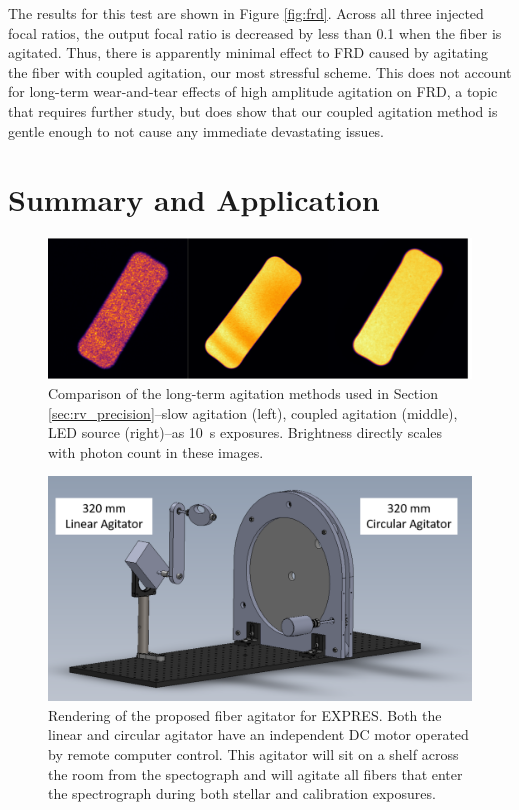 \documentclass[twocolumn]{emulateapj}
\begin{document}
The results for this test are shown in Figure {\ref{fig:frd}}. Across all three injected focal ratios, the output focal ratio is decreased by less than 0.1 when the fiber is agitated. Thus, there is apparently minimal effect to FRD caused by agitating the fiber with coupled agitation, our most stressful scheme. This does not account for long-term wear-and-tear effects of high amplitude agitation on FRD, a topic that requires further study, but does show that our coupled agitation method is gentle enough to not cause any immediate devastating issues.

\section{Summary and Application}
\label{sec:conclusions}

\begin{figure}
\centering
	\includegraphics[width=\columnwidth]{fiber_rv_error.pdf}
	\caption{Comparison of the long-term agitation methods used in Section \ref{sec:rv_precision}--slow agitation (left), coupled agitation (middle), LED source (right)--as \SI{10}{\second} exposures. Brightness directly scales with photon count in these images.}
\label{fig:fiber_rv_error}
\end{figure}

\begin{figure}
\centering
	\includegraphics[width=\columnwidth]{agitator_model.pdf}
	\caption{Rendering of the proposed fiber agitator for EXPRES. Both the linear and circular agitator have an independent DC motor operated by remote computer control. This agitator will sit on a shelf across the room from the spectograph and will agitate all fibers that enter the spectrograph during both stellar and calibration exposures.}
\label{fig:agitator_model}
\end{figure}
\end{document}
